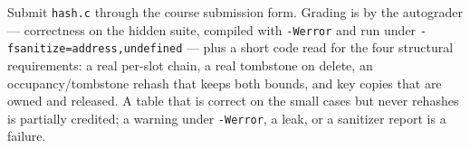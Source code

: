 \documentclass[11pt]{article}
\begin{document}
Submit \texttt{hash.c} through the course submission form. Grading is by the autograder --- correctness on the hidden suite, compiled with \texttt{-Werror} and run under \texttt{-fsanitize=address,undefined} --- plus a short code read for the four structural requirements: a real per-slot chain, a real tombstone on delete, an occupancy/tombstone rehash that keeps both bounds, and key copies that are owned and released. A table that is correct on the small cases but never rehashes is partially credited; a warning under \texttt{-Werror}, a leak, or a sanitizer report is a failure.



\end{document}
